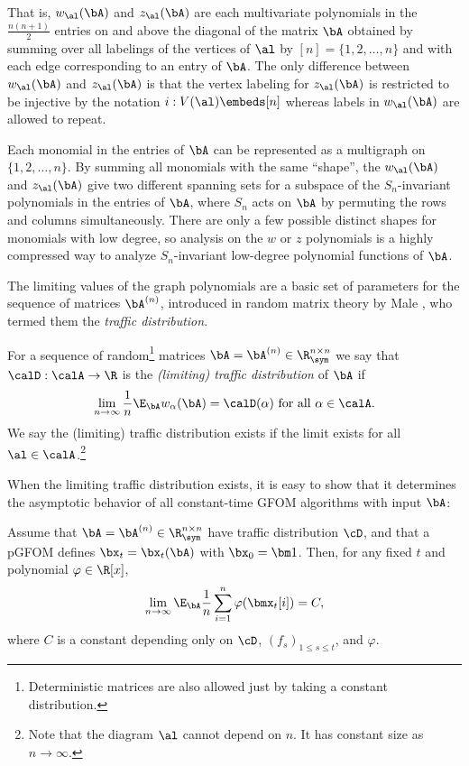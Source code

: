 \noindent That is, $w_\al(\bA)$ and $z_\al(\bA)$ are each multivariate polynomials in the $\frac{n(n + 1)}{2}$ entries on and above the diagonal of the matrix $\bA$
obtained by summing over all labelings of the vertices of $\al$ by $[n] = \{1,2,\dots, n\}$ and with each edge corresponding to an entry of $\bA$.
The only difference between $w_\al(\bA)$ and $z_\al(\bA)$ is that the vertex labeling for $z_\al(\bA)$ is restricted to be injective by the notation $i : V(\al) \embeds [n]$ whereas labels in $w_\al(\bA)$ are allowed to repeat.


Each monomial in the entries of $\bA$ can be represented as a multigraph on $\{1,2,\dots, n\}$.
By summing all monomials with the same ``shape'', the $w_\al(\bA)$ and $z_\al(\bA)$ give two different spanning sets for a subspace of the $S_n$-invariant polynomials in the entries of $\bA$, where $S_n$ acts on $\bA$ by permuting the rows and columns simultaneously.
There are only a few possible distinct shapes for monomials with low degree, so analysis on the $w$ or $z$ polynomials is a highly compressed way to analyze $S_n$-invariant low-degree polynomial functions of $\bA$.

The limiting values of the graph polynomials are a basic set of parameters for the sequence of matrices $\bA^{(n)}$, introduced in random matrix theory by Male \cite{male2020traffic}, who termed them the \emph{traffic distribution}.

\begin{definition}
\label{def:traffic-distribution}
    For a sequence of random\footnote{Deterministic matrices are also allowed just by taking a constant distribution.} matrices $\bA = \bA^{(n)} \in \R^{n \times n}_{\sym}$ we say that
    $\calD: \calA \to \R$ is the \emph{(limiting) traffic distribution} of $\bA$ if 
    \begin{equation}
    \lim_{n \to \infty} \frac{1}{n} \E_\bA w_{\alpha}(\bA) = \calD(\alpha) \text{ for all } \alpha \in \calA. \label{eq:traffic-conv}
    \end{equation}
    We say the (limiting) traffic distribution exists if the limit exists for all $\al \in \calA$.\footnote{
    Note that the diagram $\al$ cannot depend on $n$. It has constant size as $n \to \infty$.
    }
\end{definition}

When the limiting traffic distribution exists, it is easy to show that it determines the
asymptotic behavior of all constant-time GFOM algorithms with input $\bA$:
\begin{claim}
\label{prop:gfom-polynomial}
    Assume that $\bA = \bA^{(n)} \in \R^{n \times n}_{\sym}$ have traffic distribution $\cD$, and that a pGFOM defines $\bx_t = \bx_t(\bA)$ with $\bx_0 = \bm 1$.
    Then, for any fixed $t$ and polynomial $\varphi \in \R[x]$,
    \[ \lim_{n \to \infty} \E_\bA  \frac{1}{n}\sum_{i=1}^n \varphi(\bmx_{t}[i]) = C, \]
    where $C$ is a constant depending only on $\cD$, $(f_s)_{1 \leq s \leq t}$, and $\varphi$.
\end{claim}

